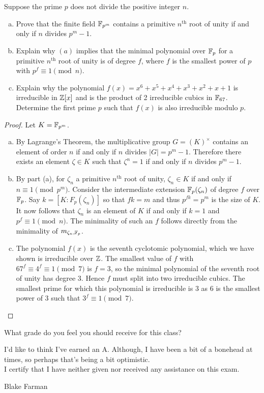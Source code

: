\documentclass[10pt]{amsart}
\begin{document}
\begin{thm}
  \label{Ex9}
  Suppose the prime $p$ does not divide the positive integer $n$.
  \begin{enumerate}[(a)]
  \item
    Prove that the finite field $\mathbb{F}_{p^m}$ contains a primitive $n^{\text{th}}$ root of unity if and only if $n$ divides $p^m - 1$.
  \item
    Explain why $(a)$ implies that the minimal polynomial over $\mathbb{F}_p$ for a primitive $n^{\text{th}}$ root of unity is of degree $f$, where $f$ is the smallest power of $p$ with $p^f \equiv 1 \pmod n$.
  \item
    Explain why the polynomial $f(x) = x^6 + x^5 + x^4 + x^3 + x^2 + x + 1$ is irreducible in $\mathbb{Z}[x]$ and is the product of 2 irreducible cubics in $\mathbb{F}_{67}$.
    Determine the first prime $p$ such that $f(x)$ is also irreducible modulo $p$.
  \end{enumerate}
  \begin{proof}
    Let $K = \mathbb{F}_{p^m}$.
    \begin{enumerate}[(a)]
    \item
        By Lagrange's Theorem, the multiplicative group $G = (K)^{\times}$ contains an element of order $n$ if and only if $n$ divides $|G| = p^m - 1$.
        Therefore there exists an element $\zeta \in K$ such that $\zeta^n = 1$ if and only if $n$ divides $p^m - 1$.
      \item
        By part (a), for $\zeta_n$ a primitive $n^{\text{th}}$ root of unity, $\zeta_n \in K$ if and only if $n \equiv 1 \pmod p^m$.
        Consider the intermediate extension $\mathbb{F}_p(\zeta_n)$ of degree $f$ over $\mathbb{F}_p$.  Say $k = [K:F_p(\zeta_n)]$ so that $fk = m$ and thus $p^{fk} = p^m$ is the size of $K$.
        It now follows that $\zeta_n$ is an element of $K$ if and only if $k = 1$ and $p^{f} \equiv 1 \pmod n$.
        The minimality of such an $f$ follows directly from the minimality of $m_{\zeta_n,\mathbb{F}_p}$.
      \item
        The polynomial $f(x)$ is the seventh cyclotomic polynomial, which we have shown is irreducible over $\mathbb{Z}$.
        The smallest value of $f$ with $67^f \equiv 4^f \equiv 1 \pmod 7$ is $f = 3$, so the minimal polynomial of the seventh root of unity has degree 3.
        Hence $f$ must split into two irreducible cubics.
        The smallest prime for which this polynomial is irreducible is 3 as 6 is the smallest power of 3 such that $3^f \equiv 1 \pmod 7.$
      \end{enumerate}
  \end{proof}
\end{thm}

\begin{thm}
  What grade do you feel you should receive for this class?
\end{thm}
I'd like to think I've earned an A.  Although, I have been a bit of a bonehead at times, so perhaps that's being a bit optimistic.\\


I certify that I have neither given nor received any assistance on this exam.

\vspace{.75in}

Blake Farman
\end{document}

